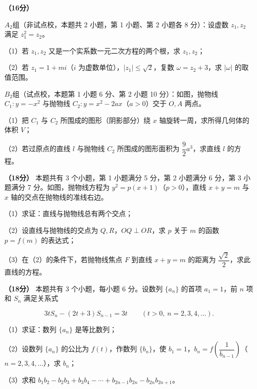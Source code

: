 \Needspace{0.4\textheight}
\begin{question}
\textbf{（16分）} 

$A_2$组（非试点校，本题共 2 小题，第 1 小题、第 2 小题各 8 分）：设虚数 $z_1,z_2$ 满足 $z_1^2=z_2$。

（1）若 $z_1,z_2$ 又是一个实系数一元二次方程的两个根，求 $z_1,z_2$；

（2）若 $z_1=1+mi$（$i$ 为虚数单位），$|z_1|\le\sqrt2$，复数 $\omega=z_2+3$，求 $|\omega|$ 的取值范围。

$B_2$组（试点校，本题第 1 小题 6 分、第 2 小题 10 分）：如图，抛物线 $C_1:y=-x^2$ 与抛物线 $C_2:y=x^2-2ax$（$a>0$）交于 $O,A$ 两点。

（1）把 $C_1$ 与 $C_2$ 所围成的图形（阴影部分）绕 $x$ 轴旋转一周，求所得几何体的体积 $V$；

（2）若过原点的直线 $l$ 与抛物线 $C_2$ 所围成的图形面积为 $\dfrac92a^3$，求直线 $l$ 的方程。
\nopagebreak[4]
\begin{center}\end{center}
\nopagebreak[4]
\Needspace{0.4\textheight}
\end{question}
\begin{question}
\textbf{（18分）} 本题共有 3 个小题，第 1 小题满分 5 分，第 2 小题满分 6 分，第 3 小题满分 7 分。如图，抛物线方程为 $y^2=p(x+1)$（$p>0$），直线 $x+y=m$ 与 $x$ 轴的交点在抛物线的准线右边。

（1）求证：直线与抛物线总有两个交点；

（2）设直线与抛物线的交点为 $Q,R$，$OQ\perp OR$，求 $p$ 关于 $m$ 的函数 $p=f(m)$ 的表达式；

（3）在（2）的条件下，若抛物线焦点 $F$ 到直线 $x+y=m$ 的距离为 $\dfrac{\sqrt2}{2}$，求此直线的方程。
\nopagebreak[4]
\begin{center}\end{center}
\nopagebreak[4]
\end{question}
\begin{question}
\textbf{（18分）} 本题共有 3 个小题，每小题 6 分。设数列 $\{a_n\}$ 的首项 $a_1=1$，前 $n$ 项和 $S_n$ 满足关系式

\nopagebreak[4]
\[3tS_n-(2t+3)S_{n-1}=3t\qquad(t>0,\ n=2,3,4,\ldots).\]

（1）求证：数列 $\{a_n\}$ 是等比数列；

（2）设数列 $\{a_n\}$ 的公比为 $f(t)$，作数列 $\{b_n\}$，使 $b_1=1$，$b_n=f\!\left(\dfrac1{b_{n-1}}\right)$（$n=2,3,4,\ldots$），求 $b_n$；

（3）求和 $b_1b_2-b_2b_3+b_3b_4-\cdots+b_{2n-1}b_{2n}-b_{2n}b_{2n+1}$。

\end{question}
